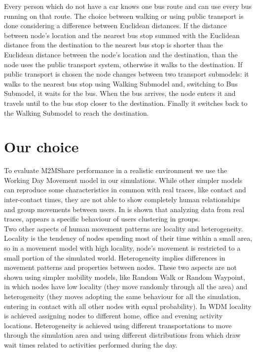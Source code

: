 Every person which do not have a car knows one bus route and can use every bus running on that route. The choice between walking or using public transport is done considering a difference between Euclidean distances. If the distance between node's location and the nearest bus stop summed with the Euclidean distance from the destination to the nearest bus stop is shorter than the Euclidean distance between the node's location and the destination, than the node uses the public transport system, otherwise it walks to the destination. If public transport is chosen the node changes between two transport submodels: it walks to the nearest bus stop using Walking Submodel and, switching to Bus Submodel, it waits for the bus. When the bus arrives, the node enters it and travels until to the bus stop closer to the destination. Finally it switches back to the Walking Submodel to reach the destination.
 
 
\section{Our choice}
To evaluate M2MShare performance in a realistic environment we use the Working Day Movement model in our simulations. While other simpler models can reproduce some characteristics in common with real traces, like contact and inter-contact times, they are not able to show completely human relationships and group movements between users. In \cite{Natarajan:2007:UUI:1762888.1762904} is shown that analyzing data from real traces, appears a specific behaviour of users clustering in groups. 
\\

Two other aspects of human movement patterns are locality and heterogeneity. Locality is the tendency of nodes spending most of their time within a small area, so in a movement model with high locality, node's movement is restricted to a small portion of the simulated world. Heterogeneity implies differences in movement patterns and properties between nodes. These two aspects are not shown using simpler mobility models, like Random Walk or Random Waypoint, in which nodes have low locality (they move randomly through all the area) and heterogeneity (they moves adopting the same behaviour for all the simulation, entering in contact with all other nodes with equal probability). In WDM locality is achieved assigning nodes to different home, office and evening activity locations. Heterogeneity is achieved using different transportations to move through the simulation area and using different distributions from which draw wait times related to activities performed during the day.
\\

